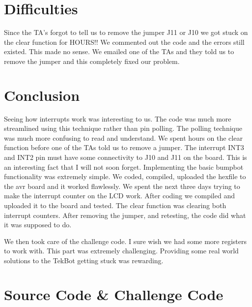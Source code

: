 \documentclass[12pt, letterpaper]{article}
\begin{document}
\section{Difficulties}

Since the TA's forgot to tell us to remove the jumper J11 or J10 we got stuck on the clear function for HOURS!! We commented out the code and the errors still existed. This made no sense. We emailed one of the TAs and they told us to remove the jumper and this completely fixed our problem.

\section{Conclusion}

Seeing how interrupts work was interesting to us. The code was much more streamlined using this technique rather than pin polling. The polling technique was much more confusing to read and understand. We spent hours on the clear function before one of the TAs told us to remove a jumper. The interrupt INT3 and INT2 pin must have some connectivity to J10 and J11 on the board. This is an interesting fact that I will not soon forget. Implementing the basic bumpbot functionality was extremely simple. We coded, compiled, uploaded the hexfile to the avr board and it worked flawlessly. We spent the next three days trying to make the interrupt counter on the LCD work. After coding we compiled and uploaded it to the board and tested. The clear function was clearing both interrupt counters. After removing the jumper, and retesting, the code did what it was supposed to do. 

We then took care of the challenge code. I sure wish we had some more registers to work with. This part was extremely challenging. Providing some real world solutions to the TekBot getting stuck was rewarding. 


\section{Source Code \& Challenge Code}
\end{document}
